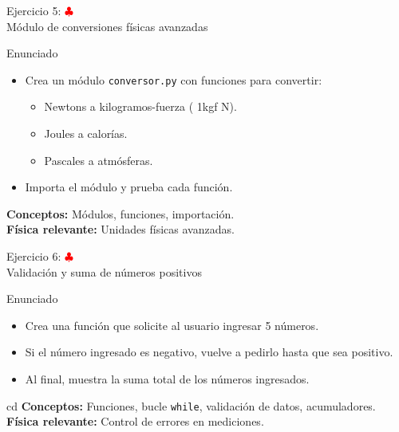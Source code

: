 \documentclass[10pt]{beamer}
\begin{document}

\begin{frame}{Ejercicio 5: \hfill \textcolor{red}{$\clubsuit$} \\ Módulo de conversiones físicas avanzadas}
  \begin{block}{Enunciado}
    \begin{itemize}
      \item Crea un módulo \texttt{conversor.py} con funciones para convertir:
        \begin{itemize}
		\item Newtons a kilogramos-fuerza ( 1kgf  N).
          \item Joules a calorías.
          \item Pascales a atmósferas.
        \end{itemize}
      \item Importa el módulo y prueba cada función.
    \end{itemize}
  \end{block}
  \textbf{Conceptos:} Módulos, funciones, importación.\\
  \textbf{Física relevante:} Unidades físicas avanzadas.
\end{frame}

\begin{frame}{Ejercicio 6: \hfill \textcolor{red}{$\clubsuit$} \\ Validación y suma de números positivos}
  \begin{block}{Enunciado}
    \begin{itemize}
      \item Crea una función que solicite al usuario ingresar 5 números.
      \item Si el número ingresado es negativo, vuelve a pedirlo hasta que sea positivo.
      \item Al final, muestra la suma total de los números ingresados.
    \end{itemize}
  \end{block}cd 
  \textbf{Conceptos:} Funciones, bucle \texttt{while}, validación de datos, acumuladores.\\
  \textbf{Física relevante:} Control de errores en mediciones.
\end{frame}
\end{document}
